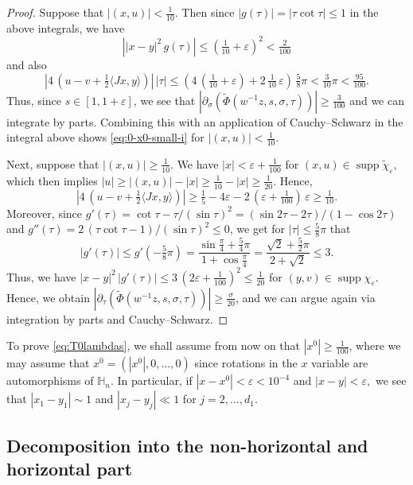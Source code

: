 \documentclass[leqno]{amsart}
\theoremstyle{definition}
\theoremstyle{remark}
\numberwithin{equation}{section}
\DeclareMathOperator*{\supp}{supp}
\newcommand\ve{{\varepsilon}}
\begin{document}
\begin{proof}
Suppose that $|(x,u)|<\frac 1 {10}$.  Then since $|g(\tau)|=
|\tau\cot\tau| \le 1$ in the above integrals, we have
\[
\left||x-y|^2 \, g(\tau)\right| \le (\tfrac 1 {10} + \varepsilon)^2 < \tfrac 2 {100}
\]
and also
\[
|4\, (u-v+\tfrac 1 2 \langle Jx,y\rangle)|\, |\tau|
 \le (4 \,(\tfrac{1}{10} +  \varepsilon) + 2 \,\tfrac{1}{10} \, \varepsilon) \,\tfrac{5}{8}\pi < \tfrac{3}{10}\pi < \tfrac{95}{100}.
\]
Thus, since $s \in [1,1+\varepsilon]$,  we see that $|\partial_\sigma (\tilde \Phi(w^{-1}z,s,\sigma,\tau))| \ge \frac 3{100}$ and we can integrate by parts. Combining this with an application of Cauchy--Schwarz in the integral above shows \eqref{eq:0-x0-small-i} for $|(x,u)|<\frac 1 {10}$.

Next, suppose that $|(x,u)|\ge \frac 1 {10}$. We have $|x| <\varepsilon + \tfrac{1}{100}$ for $(x,u)\in \supp \tilde \chi_\varepsilon$, which then implies $|u| \ge |(x,u)| - |x| \ge \tfrac 1 {10} - |x| \ge \tfrac 1 {20}$. Hence,
\[
|4\, (u-v+\tfrac 1 2 \langle Jx,y\rangle)|
 \ge  \tfrac{1}{5} - 4\varepsilon - 2 \, (\varepsilon + \tfrac 1 {100} ) \, \varepsilon \ge \tfrac 1 {10}.
\]
Moreover, since $g'(\tau)= \cot \tau - \tau/(\sin \tau)^2=( \sin 2\tau -2\tau) /(1-\cos 2\tau) $ and $g''(\tau) = 2 \,(\tau  \cot \tau - 1)/  (\sin \tau)^2 \le 0$, we get for $|\tau|\le \frac 5 8 \pi$ that
\[
|g'(\tau)|\le g'(-\tfrac 5 8 \pi) = \frac{\sin \tfrac \pi 4 + \tfrac 5 4 \pi }{1+\cos \tfrac \pi 4} = \frac{\sqrt 2 + \frac 5 2 \pi}{2 +\sqrt 2} \le 3.
\]
Thus, we have $|x-y|^2\,|g'(\tau)|\le 3\, (2\varepsilon+\frac 1 {100})^2\le \frac{1}{20}$ for $(y,v)\in\supp \chi_\varepsilon$. Hence, we obtain $|\partial_\tau (\tilde \Phi(w^{-1}z,s,\sigma,\tau))| \ge \frac \sigma{20}$, and we can argue again via integration by parts and Cauchy--Schwarz.
\end{proof}

To prove \eqref{eq:T0lambdas}, we shall assume from now on that $|x^0|\ge \frac{1}{100}$, where we may assume that  $x^0=(|x^0|,0, \dots,0)$ since rotations in the $x$ variable are automorphisms of $\mathbb H_n$. In particular, if $|x-x^0|<\ve< 10^{-4}$ and $|x-y|<\ve,$ we see that $|x_1-y_1|\sim 1$ and $|x_j-y_j|\ll 1$ for $j=2,\dots, d_1$.


\subsection{Decomposition into the non-horizontal and horizontal part}\label{nh+h}
\end{document}

